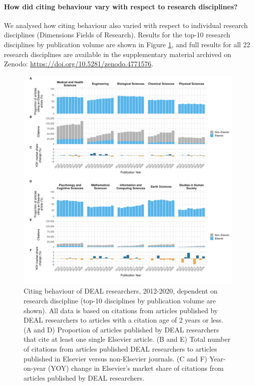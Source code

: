 \documentclass[
]{article}
\begin{document}
\hypertarget{how-did-citing-behaviour-vary-with-respect-to-research-disciplines}{%
\paragraph{How did citing behaviour vary with respect to research disciplines?}\label{how-did-citing-behaviour-vary-with-respect-to-research-disciplines}}

We analysed how citing behaviour also varied with respect to individual research disciplines (Dimensions Fields of Research). Results for the top-10 research disciplines by publication volume are shown in Figure \ref{fig:references-publisher-year-category}, and full results for all 22 research disciplines are available in the supplementary material archived on Zenodo: \url{https://doi.org/10.5281/zenodo.4771576}.

\begin{figure}
\centering
\includegraphics{analysis_files/figure-latex/references-publisher-year-category-1.pdf}
\caption{\label{fig:references-publisher-year-category}Citing behaviour of DEAL researchers, 2012-2020, dependent on research discipline (top-10 disciplines by publication volume are shown). All data is based on citations from articles published by DEAL researchers to articles with a citation age of 2 years or less. (A and D) Proportion of articles published by DEAL researchers that cite at least one single Elsevier article. (B and E) Total number of citations from articles published DEAL researchers to articles published in Elsevier versus non-Elsevier journals. (C and F) Year-on-year (YOY) change in Elsevier's market share of citations from articles published by DEAL researchers.}
\end{figure}
\end{document}
